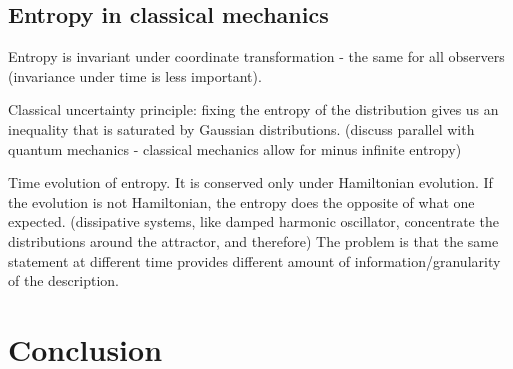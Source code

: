 \documentclass{article}
\begin{document}
\subsection{Entropy in classical mechanics}

Entropy is invariant under coordinate transformation - the same for all observers (invariance under time is less important).

Classical uncertainty principle: fixing the entropy of the distribution gives us an inequality that is saturated by Gaussian distributions. (discuss parallel with quantum mechanics - classical mechanics allow for minus infinite entropy)

Time evolution of entropy. It is conserved only under Hamiltonian evolution. If the evolution is not Hamiltonian, the entropy does the opposite of what one expected. (dissipative systems, like damped harmonic oscillator, concentrate the distributions around the attractor, and therefore) The problem is that the same statement at different time provides different amount of information/granularity of the description.


\section{Conclusion}
	
\end{document}
